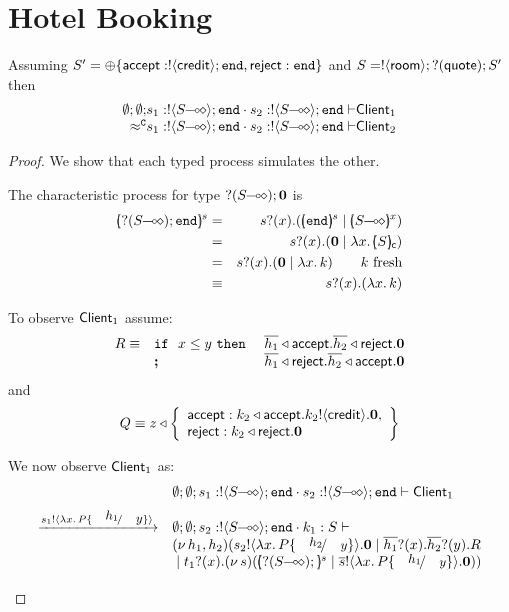 \section{Hotel Booking}
\label{hotel_closure}
\begin{proposition}
	Assuming $S' = \oplus \{\mathsf{accept}: ! \langle \mathsf{credit} \rangle ; \mathtt{end}, \mathsf{reject}: \mathtt{end}\}$ and
	$S = ! \langle \mathsf{room} \rangle ; ? (\mathsf{quote}) ; S'$
	then
\[
	\ahorel
	{\es}{s_1: \btout{\lhot{S}} \tinact \cat s_2: \btout{\lhot{S}} \tinact}{\Client_1}
	{\wbf}
	{s_1: \btout{\lhot{S}} \tinact \cat s_2: \btout{\lhot{S}} \tinact}{\Client_2}
\]
\end{proposition}

\begin{proof}
	We show that each typed process simulates the other.

	The characteristic process for type $? (S\!\! \multimap\!\! \diamond) ; \mathbf{0}$ is
	\begin{eqnarray*}
		\mapchar{\btinp{\lhot{S}} \tinact}{s} &=& \binp{s}{x} (\mapchar{\tinact}{s} \Par \mapchar{\lhot{S}}{x})\\
		&=& \binp{s}{x} (\inact \Par \abs{x}{\omapchar{S}})\\
		&=& \binp{s}{x} (\inact \Par \abs{x}{k}) \qquad k \textrm{ fresh}\\
		&\scong& \binp{s}{x} (\abs{x}{k})
	\end{eqnarray*}

	\noi To observe $\mathsf{Client}_1$ assume:
\[
	\begin{array}{lll}
		R \equiv & \mathtt{if}\ \ x \leq y\ \mathtt{then}\  & \overline{h_1} \triangleleft \mathsf{accept} . \overline{h_2} \triangleleft \mathsf{reject} . \mathbf{0}\\
		&\boldsymbol{;}& \overline{h_1} \triangleleft \mathsf{reject} . \overline{h_2} \triangleleft \mathsf{accept} . \mathbf{0}
	\end{array} \\
\]
	\noi and
\[
	Q \equiv z \triangleleft \left\{
		\begin{array}{l}
			\mathsf{accept}: k_2 \triangleleft \mathsf{accept} . k_2 ! \langle \mathsf{credit} \rangle . \mathbf{0},\\
			\mathsf{reject}: k_2 \triangleleft \mathsf{reject} . \mathbf{0}
		\end{array}
		\right\}
\]

	\noi We now observe $\mathsf{Client}_1$ as:
\[
	\begin{array}{ll}
		& \es; \es; s_1: \btout{\lhot{S}} \tinact \cat s_2: \btout{\lhot{S}} \tinact \proves \Client_1
		\\[2mm]

		\by{\bactout{s_1}{\abs{x}{P \subst{h_1}{y}}}}&
		\es; \es; s_2: \btout{\lhot{S}} \tinact \cat k_1: S \proves \\
		& \newsp{h_1, h_2}{\bout{s_2}{\abs{x}{P \subst{h_2}{y}}} \inact
		\Par \binp{\dual{h_1}}{x} \binp{\dual{h_2}}{y} R\\
		& \Par \binp{t_1}{x} \newsp{s}{\mapchar{\btinp{\lhot{S}}}{s} \Par \bout{\dual{s}}{\abs{x}{P \subst{h_1}{y}}} \inact }}
		\\[2mm]


\end{array}\]
\end{proof}
